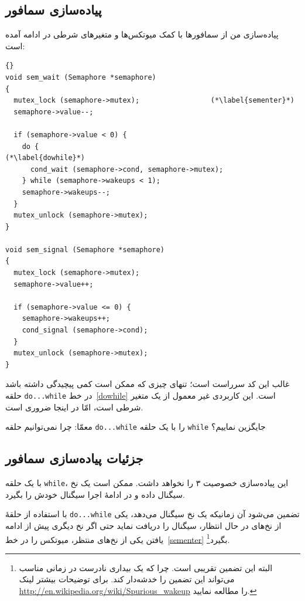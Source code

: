 \documentclass{book}
\newcommand{\clearemptydoublepage}{\newpage\cleardoublepage}
\begin{document}
\clearemptydoublepage
\subsection{پیاده‌سازی سمافور}

    پیاده‌سازی من از سمافورها با کمک میوتکس‌ها و متغیرهای شرطی  در ادامه آمده است:

\begin{latin}
\begin{lstlisting}[title={}]{}
void sem_wait (Semaphore *semaphore)
{
  mutex_lock (semaphore->mutex);                 (*\label{sementer}*)
  semaphore->value--;

  if (semaphore->value < 0) {
    do {                                                (*\label{dowhile}*)
      cond_wait (semaphore->cond, semaphore->mutex);
    } while (semaphore->wakeups < 1);
    semaphore->wakeups--;
  }
  mutex_unlock (semaphore->mutex);
}

void sem_signal (Semaphore *semaphore)
{
  mutex_lock (semaphore->mutex);
  semaphore->value++;

  if (semaphore->value <= 0) {
    semaphore->wakeups++;
    cond_signal (semaphore->cond);
  }
  mutex_unlock (semaphore->mutex);
}
\end{lstlisting}
\end{latin}

    غالب این کد سرراست است؛ تنهای چیزی که ممکن است کمی پیچیدگی داشته باشد حلقه {\tt do...while} در خط~\ref{dowhile} است. 
    این کاربردی غیر معمول از یک متغیر شرطی است، امّا در اینجا ضروری است. 

    معمّا: چرا نمی‌توانیم حلقه {\tt do...while} را با یک حلقه {\tt while}  جایگزین نماییم؟

\clearemptydoublepage
\subsection{جزئیات پیاده‌سازی سمافور}

    با یک حلقه {\tt while}، این پیاده‌سازی خصوصیت ۳ را نخواهد داشت. ممکن است یک نخ سیگنال داده و در ادامهٔ اجرا سیگنال خودش 
    را بگیرد. 

    با استفاده از حلقهٔ {\tt do...while} تضمین می‌شود آن زمانیکه یک نخ سیگنال می‌دهد، یکی از نخ‌های در حال انتظار، سیگنال را دریافت نماید 
    حتی اگر نخ دیگری  پیش از ادامه یافتن یکی از نخ‌های منتظر، میوتکس را در خط~\ref{sementer} بگیرد\footnote{
    البته این تضمین تقریبی است. چرا که یک بیداری نادرست در زمانی مناسب می‌تواند این تضمین را خدشه‌دار کند. برای توضیحات بیشتر لینک 
    \url{http://en.wikipedia.org/wiki/Spurious_wakeup} را مطالعه نمایید. 
    }.
\end{document}
